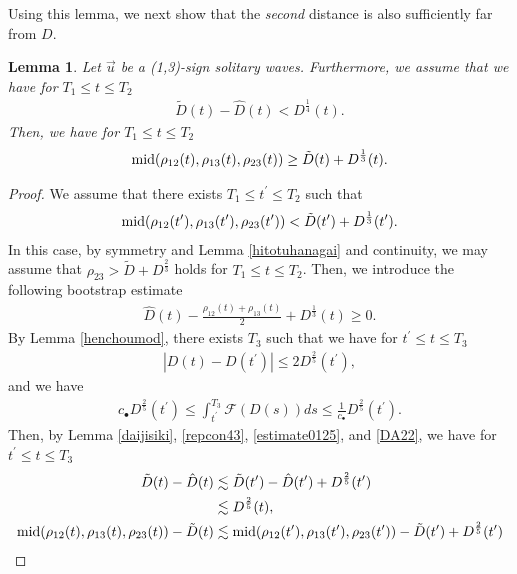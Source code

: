 \documentclass[reqno]{amsart}
\theoremstyle{plain}
\newtheorem{lemma}[theorem]{Lemma}
\theoremstyle{definition}
\numberwithin{equation}{section}
\newcommand{\m}{\mbox{\textnormal{mid}}}
\newcommand{\1}{\mathbbm{1}}
\begin{document}
Using this lemma, we next show that the \emph{second} distance is also sufficiently far from $D$.


\begin{lemma}\label{midhenchou}
Let $\vec{u}$ be a (1,3)-sign solitary waves. Furthermore, we assume that we have for $T_1\leq t\leq T_2$
\begin{align}\label{estimate0125}
\tilde{D}(t)-\hat{D}(t)<D^{\frac{1}{4}}(t).
\end{align}
Then, we have for $T_1\leq t\leq T_2$
\begin{align}\label{DA21}
\m{(\rho_{12}(t),\rho_{13}(t),\rho_{23}(t))}\geq \tilde{D}(t)+D^{\frac{1}{3}}(t).
\end{align}
\end{lemma}
\begin{proof}
We assume that there exists $T_1\leq t^{\prime}\leq T_2$ such that 
\begin{align}\label{DA22}
\m{(\rho_{12}(t^{\prime}),\rho_{13}(t^{\prime}),\rho_{23}(t^{\prime}))}<\tilde{D}(t^{\prime})+D^{\frac{1}{3}}(t^{\prime}).
\end{align} 
In this case, by symmetry and Lemma \ref{hitotuhanagai} and continuity, we may assume that
$\rho_{23}>\tilde{D}+D^{\frac{2}{3}}$ holds for $T_1\leq t\leq T_2$. Then, we introduce the following bootstrap estimate
\begin{align}\label{bsass2}
\hat{D}(t)-\frac{\rho_{12}(t)+\rho_{13}(t)}{2}+D^{\frac{1}{3}}(t)\geq 0.
\end{align}
By Lemma \ref{henchoumod}, there exists $T_3$ such that we have for $t^{\prime}\leq t\leq T_3$
\begin{align*}
|D(t)-D(t^{\prime})|\leq 2D^{\frac{2}{5}}(t^{\prime}),
\end{align*}
and we have
\begin{align*}
c_{\bullet} D^{\frac{2}{5}}(t^{\prime})\leq \int_{t^{\prime}}^{T_3}\mathcal{F}(D(s))ds\leq \frac{1}{c_{\bullet}} D^{\frac{2}{5}}(t^{\prime}).
\end{align*}
Then, by Lemma \ref{daijisiki}, \eqref{repcon43}, \eqref{estimate0125}, and \eqref{DA22}, we have for $t^{\prime}\leq t\leq T_3$
\begin{align*}
\tilde{D}(t)-\hat{D}(t)&\lesssim \tilde{D}(t^{\prime})-\hat{D}(t^{\prime})+D^{\frac{2}{5}}(t^{\prime})
\\
&\lesssim D^{\frac{2}{5}}(t),
\\
\m{(\rho_{12}(t),\rho_{13}(t),\rho_{23}(t))}-\tilde{D}(t)&\lesssim \m{(\rho_{12}(t^{\prime}),\rho_{13}(t^{\prime}),\rho_{23}(t^{\prime}))}-\tilde{D}(t^{\prime})+D^{\frac{2}{5}}(t^{\prime})

\end{align*}
\end{proof}
\end{document}
